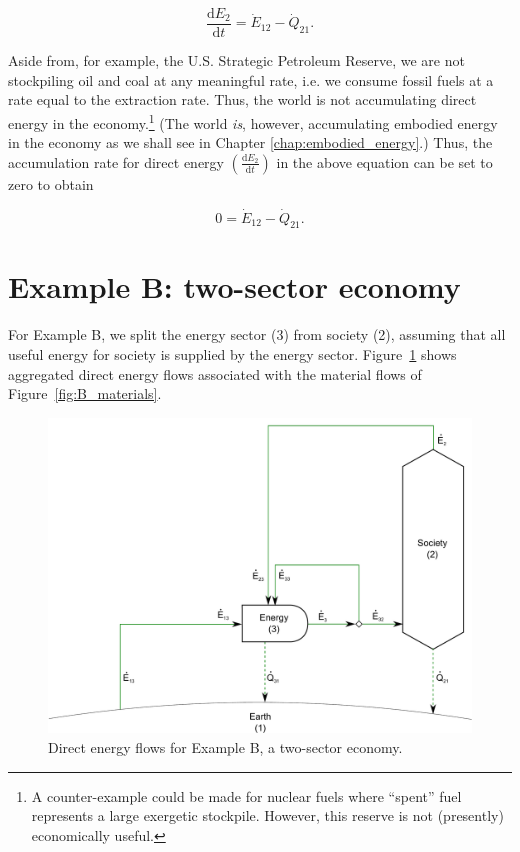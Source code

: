 \begin{equation} \label{eq:dE_2/dt_single_sector}
	\frac{\mathrm{d}E_{2}}{\mathrm{d}t} = \dot{E}_{12} - \dot{Q}_{21}.
\end{equation}

Aside from, for example, the U.S. Strategic Petroleum Reserve, 
we are not stockpiling oil and coal at any meaningful rate, 
i.e. we consume fossil fuels at a rate equal to the extraction rate. 
Thus, the world is not accumulating direct energy 
in the economy.\footnote{A counter-example could be made 
for nuclear fuels where ``spent'' fuel represents a large exergetic stockpile. 
However, this reserve is not (presently) economically useful.} 
(The world \emph{is}, however, 
accumulating embodied energy in the economy as we shall see 
in Chapter \ref{chap:embodied_energy}.) 
Thus, the accumulation rate for direct energy 
$\left( \frac{\mathrm{d}E_{2}}{\mathrm{d}t} \right)$ in the above equation 
can be set to zero to obtain

\begin{equation} \label{eq:single_sector_direct_energy_no_accumulation}
	0 = \dot{E}_{12} - \dot{Q}_{21}.
\end{equation}


\section{Example B: two-sector economy}
\label{sec:B_energy}

For Example B, we split the energy sector (3) from 
society (2), assuming that all useful energy for society is 
supplied by the energy sector. Figure~\ref{fig:B_energy} shows aggregated
direct energy flows associated with the material flows of Figure~\ref{fig:B_materials}.

\begin{figure}[h!]
\centering
\includegraphics[width=0.8\linewidth]{Part_2/Chapter_Energy/images/2_sector_direct_energy.pdf}
\caption{Direct energy flows for Example B, a two-sector economy.}
\label{fig:B_energy}
\end{figure}

